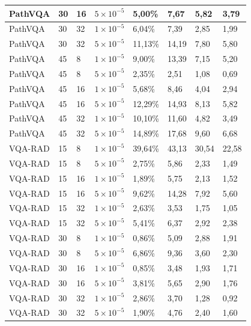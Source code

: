\begin{longtable}[c]{|l|l|l|l|l|l|l|l|}
    PathVQA & 30 & 16 & $5 \times 10^{-5}$ & 5,00\%  & 7,67  & 5,82  & 3,79  \\ \hline
    PathVQA & 30 & 32 & $1 \times 10^{-5}$ & 6,04\%  & 7,39  & 2,85  & 1,99  \\ \hline
    PathVQA & 30 & 32 & $5 \times 10^{-5}$ & 11,13\% & 14,19 & 7,80  & 5,80  \\ \hline
    PathVQA & 45 & 8  & $1 \times 10^{-5}$ & 9,00\%  & 13,39 & 7,15  & 5,20  \\ \hline
    PathVQA & 45 & 8  & $5 \times 10^{-5}$ & 2,35\%  & 2,51  & 1,08  & 0,69  \\ \hline
    PathVQA & 45 & 16 & $1 \times 10^{-5}$ & 5,68\%  & 8,46  & 4,04  & 2,94  \\ \hline
    PathVQA & 45 & 16 & $5 \times 10^{-5}$ & 12,29\% & 14,93 & 8,13  & 5,82  \\ \hline
    PathVQA & 45 & 32 & $1 \times 10^{-5}$ & 10,10\% & 11,60 & 4,82  & 3,49  \\ \hline
    PathVQA & 45 & 32 & $5 \times 10^{-5}$ & 14,89\% & 17,68 & 9,60  & 6,68  \\ \hline
    VQA-RAD & 15 & 8  & $1 \times 10^{-5}$ & 39,64\% & 43,13 & 30,54 & 22,58 \\ \hline
    VQA-RAD & 15 & 8  & $5 \times 10^{-5}$ & 2,75\%  & 5,86  & 2,33  & 1,49  \\ \hline
    VQA-RAD & 15 & 16 & $1 \times 10^{-5}$ & 1,89\%  & 5,75  & 2,13  & 1,52  \\ \hline
    VQA-RAD & 15 & 16 & $5 \times 10^{-5}$ & 9,62\%  & 14,28 & 7,92  & 5,60  \\ \hline
    VQA-RAD & 15 & 32 & $1 \times 10^{-5}$ & 2,63\%  & 3,53  & 1,75  & 1,05  \\ \hline
    VQA-RAD & 15 & 32 & $5 \times 10^{-5}$ & 5,41\%  & 6,37  & 2,92  & 2,38  \\ \hline
    VQA-RAD & 30 & 8  & $1 \times 10^{-5}$ & 0,86\%  & 5,09  & 2,88  & 1,91  \\ \hline
    VQA-RAD & 30 & 8  & $5 \times 10^{-5}$ & 6,86\%  & 9,36  & 3,60  & 2,30  \\ \hline
    VQA-RAD & 30 & 16 & $1 \times 10^{-5}$ & 0,85\%  & 3,48  & 1,93  & 1,71  \\ \hline
    VQA-RAD & 30 & 16 & $5 \times 10^{-5}$ & 3,81\%  & 5,65  & 2,90  & 1,76  \\ \hline
    VQA-RAD & 30 & 32 & $1 \times 10^{-5}$ & 2,86\%  & 3,70  & 1,28  & 0,92  \\ \hline
    VQA-RAD & 30 & 32 & $5 \times 10^{-5}$ & 1,90\%  & 4,76  & 2,40  & 1,60  \\ \hline

\end{longtable}
